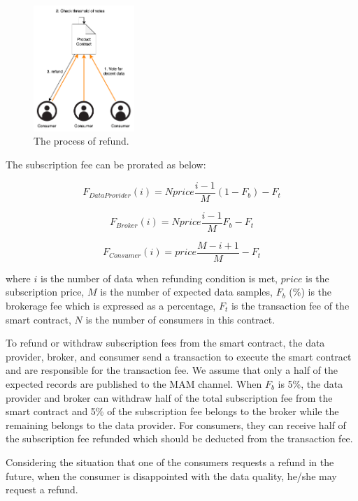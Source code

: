 \documentclass[conference]{IEEEtran}
\begin{document}
\begin{figure}[!t]
	\centering
	\includegraphics[width=1.5in]{refund}
	\caption{The process of refund.}
	\label{fig:refund}
\end{figure}

The subscription fee can be prorated as below:

\begin{equation}
    F_{DataProvider}(i) = N price \frac{i-1}{M} (1-F_{b}) -F_{t}
\end{equation}

\begin{equation}
    F_{Broker}(i) = N price \frac{i-1}{M} F_{b} -F_{t}
\end{equation}

\begin{equation}
    F_{Consumer}(i) = price \frac{M-i+1}{M} -F_{t}
\end{equation}

where $i$ is the number of data when refunding condition is met, $price$  is the subscription price, $M$ is the number of expected data samples, $F_{b}$ (\%) is the brokerage fee which is expressed as a percentage, $F_{t}$ is the transaction fee of the smart contract, $N$ is the number of consumers in this contract.

To refund or withdraw subscription fees from the smart contract, the data provider, broker, and consumer send a transaction to execute the smart contract and are responsible for the transaction fee. We assume that only a half of the expected records are published to the MAM channel. When $F_{b}$ is 5\%, the data provider and broker can withdraw half of the total subscription fee from the smart contract and 5\% of the subscription fee belongs to the broker while the remaining belongs to the data provider. For consumers, they can receive half of the subscription fee refunded which should be deducted from the transaction fee.

Considering the situation that one of the consumers requests a refund in the future, when the consumer is disappointed with the data quality, he/she may request a refund.
\end{document}
